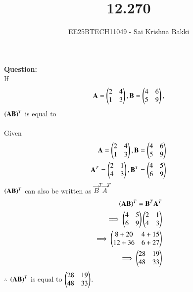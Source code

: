 \documentclass[journal]{IEEEtran}
\begin{document}

\vspace{3cm}

\title{12.270}
\author{EE25BTECH11049 - Sai Krishna Bakki}
\maketitle
\vspace{-3em}
\textbf{Question:}\\
If
\begin{align*}
    \mathbf{A}=\begin{pmatrix}2&4\\1&3\end{pmatrix},\mathbf{B}=\begin{pmatrix}4&6\\5&9\end{pmatrix},
\end{align*}
$\left(\mathbf{A}\mathbf{B}\right)^T$ is equal to\\
\solution\\
Given
\begin{align}
    \mathbf{A}=\begin{pmatrix}2&4\\1&3\end{pmatrix},\mathbf{B}=\begin{pmatrix}4&6\\5&9\end{pmatrix}\\
    \mathbf{A}^T=\begin{pmatrix}2&1\\4&3\end{pmatrix},\mathbf{B}^T=\begin{pmatrix}4&5\\6&9\end{pmatrix}
\end{align}
$\left(\mathbf{A}\mathbf{B}\right)^T$ can also be written as $\vec{B}^T\vec{A}^T$
\begin{align}
    \left(\mathbf{A}\mathbf{B}\right)^T=\mathbf{B}^T\mathbf{A}^T\\
    \implies \begin{pmatrix}4&5\\6&9\end{pmatrix}\begin{pmatrix}2&1\\4&3\end{pmatrix}\\
    \implies\begin{pmatrix}8+20&4+15\\12+36&6+27\end{pmatrix}\\
    \implies \begin{pmatrix}28&19\\48&33\end{pmatrix}
\end{align}
$\therefore$ $ \left(\mathbf{A}\mathbf{B}\right)^T$ is equal to  $\begin{pmatrix}28&19\\48&33\end{pmatrix}$.
\end{document}
